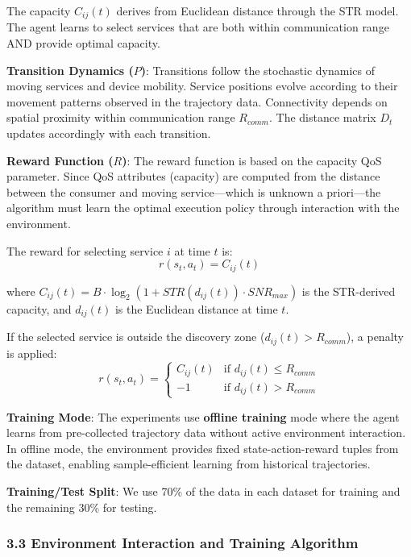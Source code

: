 The capacity \(C_{ij}(t)\) derives from Euclidean distance through the
STR model. The agent learns to select services that are both within
communication range AND provide optimal capacity.

\textbf{Transition Dynamics (\(P\))}: Transitions follow the stochastic
dynamics of moving services and device mobility. Service positions
evolve according to their movement patterns observed in the trajectory
data. Connectivity depends on spatial proximity within communication
range \(R_{comm}\). The distance matrix \(D_t\) updates accordingly
with each transition.

\textbf{Reward Function (\(R\))}: The reward function is based on the
capacity QoS parameter. Since QoS attributes (capacity) are computed
from the distance between the consumer and moving service---which is
unknown a priori---the algorithm must learn the optimal execution
policy through interaction with the environment.

The reward for selecting service \(i\) at time \(t\) is:
\[r(s_t, a_t) = C_{ij}(t)\]

where \(C_{ij}(t) = B \cdot \log_2(1 + STR(d_{ij}(t)) \cdot SNR_{max})\)
is the STR-derived capacity, and \(d_{ij}(t)\) is the Euclidean distance
at time \(t\).

If the selected service is outside the discovery zone
(\(d_{ij}(t) > R_{comm}\)), a penalty is applied:
\[r(s_t, a_t) = \begin{cases} C_{ij}(t) & \text{if } d_{ij}(t) \leq R_{comm} \\ -1 & \text{if } d_{ij}(t) > R_{comm} \end{cases}\]

\textbf{Training Mode}: The experiments use \textbf{offline training}
mode where the agent learns from pre-collected trajectory data without
active environment interaction. In offline mode, the environment
provides fixed state-action-reward tuples from the dataset, enabling
sample-efficient learning from historical trajectories.

\textbf{Training/Test Split}: We use 70\% of the data in each dataset
for training and the remaining 30\% for testing.

\hypertarget{environment-interaction-and-training-algorithm}{%
	\subsubsection{3.3 Environment Interaction and Training
		Algorithm}\label{environment-interaction-and-training-algorithm}}

